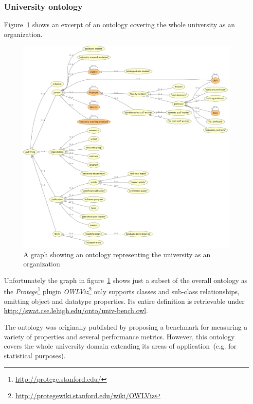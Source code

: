 \documentclass{article}
\begin{document}
\subsubsection{University ontology}
Figure~\ref{fig:owl-univ1} shows an excerpt of an ontology covering the whole university as an organization.
\begin{figure}[H]
	\centering \includegraphics*[width=.8\columnwidth]{owl-univ1.png}
	\caption{A graph showing an ontology representing the university as an organization}
	\label{fig:owl-univ1}
\end{figure}
Unfortunately the graph in figure~\ref{fig:owl-univ1} shows just a subset of the overall ontology as the \textit{Protege}\footnote{\url{http://protege.stanford.edu/}} plugin \textit{OWLViz}\footnote{\url{http://protegewiki.stanford.edu/wiki/OWLViz}} only supports classes and sub-class relationships, omitting object and datatype properties. Its entire definition is retrievable under \url{http://swat.cse.lehigh.edu/onto/univ-bench.owl}. 

The ontology was originally published by \citet{article:university-ontology} proposing a benchmark for measuring a variety of properties and several performance
metrics. However, this ontology covers the whole university domain extending its areas of application~(e.g. for statistical purposes). 
\end{document}
